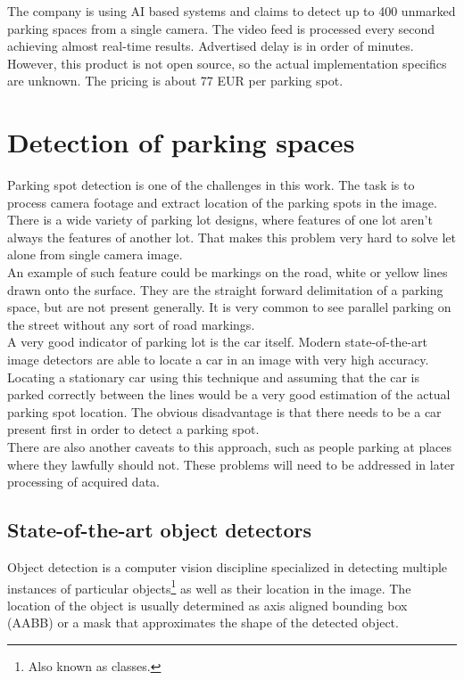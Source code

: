\documentclass[thesis=M,english]{FITthesis}[2019/03/06]
\begin{document}
The company is using AI based systems and claims to detect up to 400 unmarked parking spaces from a single camera. The video feed is processed every second achieving almost real-time results. Advertised delay is in order of minutes.\\

However, this product is not open source, so the actual implementation specifics are unknown. The pricing is about 77 EUR per parking spot.




\section{Detection of parking spaces}
Parking spot detection is one of the challenges in this work. The task is to process camera footage and extract location of the parking spots in the image.
\\ 

There is a wide variety of parking lot designs, where features of one lot aren't always the features of another lot. That makes this problem very hard to solve let alone from single camera image.
\\



An example of such feature could be markings on the road, white or yellow lines drawn onto the surface. They are the straight forward delimitation of a parking space, but are not present generally. It is very common to see parallel parking on the street without any sort of road markings.
\\


A very good indicator of parking lot is the car itself. Modern state-of-the-art image detectors are able to locate a car in an image with very high accuracy. Locating a stationary car using this technique and assuming that the car is parked correctly between the lines would be a very good estimation of the actual parking spot location. The obvious disadvantage is that there needs to be a car present first in order to detect a parking spot.
\\


There are also another caveats to this approach, such as people parking at places where they lawfully should not. These problems will need to be addressed in later processing of acquired data.



\subsection{State-of-the-art object detectors}
Object detection is a computer vision discipline specialized in detecting multiple instances of particular objects\footnote{Also known as classes.} as well as their location in the image. The location of the object is usually determined as axis aligned bounding box (AABB) or a mask that approximates the shape of the detected object.\\
\end{document}
